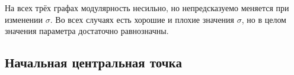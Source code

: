 На всех трёх графах модулярность несильно, но непредсказуемо меняется при изменении $\sigma$. Во всех случаях есть хорошие и плохие значения $\sigma$, но в целом значения параметра достаточно равнозначны.



\subsection{Начальная центральная точка}
